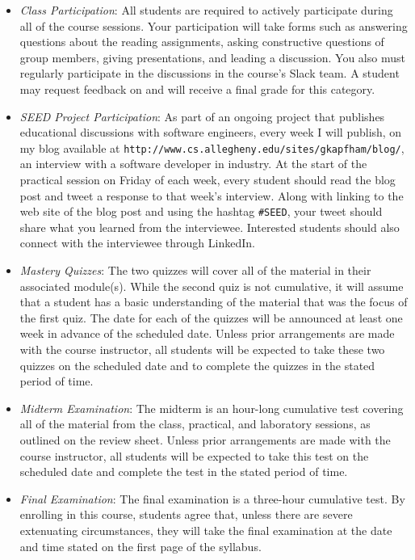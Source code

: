 \documentclass[11pt]{article}
\newcommand{\url}[1]{\lstinline{#1}}
\begin{document}
\begin{itemize}

  \item {\em Class Participation\/}: All students are required to actively participate during all of the course
    sessions. Your participation will take forms such as answering questions about the reading assignments, asking
    constructive questions of group members, giving presentations, and leading a discussion. You also must regularly
    participate in the discussions in the course's Slack team. A student may request feedback on and will receive a
    final grade for this category.

  \item {\em SEED Project Participation\/}: As part of an ongoing project that publishes educational discussions with
    software engineers, every week I will publish, on my blog available at
    \url{http://www.cs.allegheny.edu/sites/gkapfham/blog/}, an interview with a software developer in industry. At the
    start of the practical session on Friday of each week, every student should read the blog post and tweet a response
    to that week's interview. Along with linking to the web site of the blog post and using the hashtag \url{#SEED},
    your tweet should share what you learned from the interviewee. Interested students should also connect with the
    interviewee through LinkedIn.

  \item {\em Mastery Quizzes\/}: The two quizzes will cover all of the material in their associated module(s). While the
    second quiz is not cumulative, it will assume that a student has a basic understanding of the material that was the
    focus of the first quiz. The date for each of the quizzes will be announced at least one week in advance of the
    scheduled date. Unless prior arrangements are made with the course instructor, all students will be expected to take
    these two quizzes on the scheduled date and to complete the quizzes in the stated period of time.

  \item {\em Midterm Examination\/}: The midterm is an hour-long cumulative test covering all of the material from the
    class, practical, and laboratory sessions, as outlined on the review sheet. Unless prior arrangements are made with
    the course instructor, all students will be expected to take this test on the scheduled date and complete the test
    in the stated period of time.

  \item {\em Final Examination\/}: The final examination is a three-hour cumulative test. By enrolling in this course,
    students agree that, unless there are severe extenuating circumstances, they will take the final examination at the
    date and time stated on the first page of the syllabus.


\end{itemize}
\end{document}
